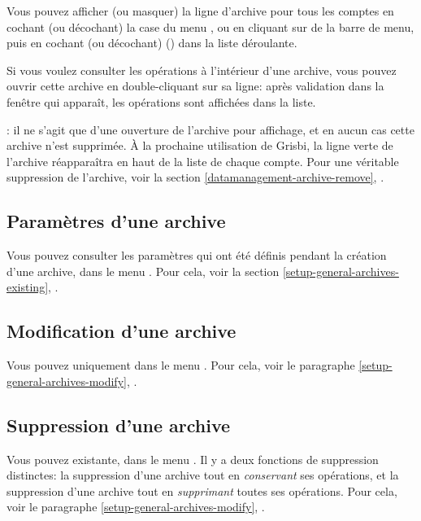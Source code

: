 Vous pouvez afficher (ou masquer) la ligne d'archive pour tous les comptes en cochant (ou décochant) la case du menu , ou en cliquant sur  de la barre de menu, puis en cochant (ou décochant)  () dans la liste déroulante.

Si vous voulez consulter les opérations à l'intérieur d'une archive, vous pouvez ouvrir cette archive en double-cliquant sur sa ligne: après validation dans la fenêtre qui apparaît, les opérations sont affichées dans la liste. 

\Note{}: il ne s'agit que d'une ouverture de l'archive pour affichage, et en aucun cas cette archive n'est supprimée. À la prochaine utilisation de Grisbi, la ligne verte de l'archive réapparaîtra en haut de la liste de chaque compte. Pour une véritable suppression de l'archive, voir la section \vref{datamanagement-archive-remove}, .

\subsection{Paramètres d'une archive\label{datamanagement-archive-parameters}}

Vous pouvez consulter les paramètres qui ont été définis pendant la création d'une archive, dans le menu
. Pour cela, voir la section \vref{setup-general-archives-existing}, .


\subsection{Modification d'une archive\label{datamanagement-archive-modify}}

Vous pouvez uniquement  dans le menu . Pour cela, voir le paragraphe \vref{setup-general-archives-modify}, .


\subsection{Suppression d'une archive\label{datamanagement-archive-remove}}

Vous pouvez  existante, dans le menu . Il y a deux fonctions de suppression distinctes: la suppression d'une archive tout en \emph{conservant} ses opérations, et la suppression d'une archive tout en \emph{supprimant} toutes ses opérations. Pour cela, voir le paragraphe \vref{setup-general-archives-modify}, . 


